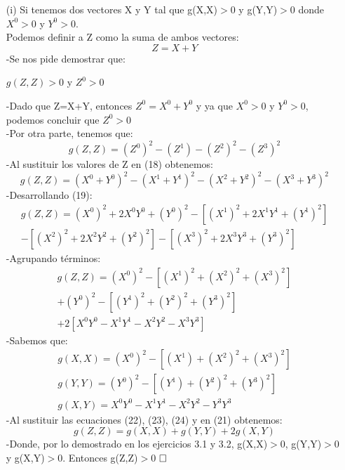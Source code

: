 \documentclass[a4paper, 11pt]{article}
\begin{document}
\begin{enumerate}
    \item[(i)]
    Si tenemos dos vectores X y Y tal que g(X,X)$>$0 y g(Y,Y)$>$0
    donde $X^{0}>$0 y $Y^{0}>$0.\\
    Podemos definir a Z como la suma de ambos vectores:
    \begin{equation*}
        Z=X+Y
    \end{equation*}
    -Se nos pide demostrar que:
    \begin{center}
        $g(Z,Z)>$0 y $Z^{0}>$0
    \end{center} 
    
    -Dado que Z=X+Y, entonces $Z^{0}=X^{0}+Y^{0}$ y ya que $X^{0}>$0 y $Y^{0}>$0, podemos concluir que $Z^{0}>0$\\
    -Por otra parte, tenemos que:
    \begin{equation}
        g(Z,Z)=(Z^{0})^2 - (Z^{1}) - (Z^{2})^2 - (Z^{3})^2
    \end{equation}
    -Al sustituir los valores de Z en (18) obtenemos:
    \begin{equation}
        g(Z,Z)=(X^{0}+Y^{0})^2 - (X^{1}+Y^{1})^2 - (X^{2}+Y^{2})^2 - (X^{3}+Y^{3})^2
    \end{equation}
    -Desarrollando (19):
    \begin{eqnarray}
    \nonumber g(Z,Z)=(X^{0})^2 + 2X^{0}Y^{0} + (Y^{0})^2 - [(X^{1})^2 + 2X^{1}Y^{1} + (Y^{1})^2]\\ 
    - [(X^{2})^2 + 2X^{2}Y^{2} + (Y^{2})^2] - [(X^{3})^2 + 2X^{3}Y^{3} + (Y^{3})^2]  
    \end{eqnarray}
    -Agrupando términos:
    \begin{eqnarray}
    \nonumber g(Z,Z)=(X^{0})^2 -[(X^{1})^2+(X^{2})^2+(X^{3})^2]\\ \nonumber + (Y^{0})^2 - [(Y^{1})^2+(Y^{2})^2 +(Y^{3})^2]\\+ 2[X^{0}Y^{0}  - X^{1}Y^{1} - X^{2}Y^{2} - X^{3}Y^{3}] 
    \end{eqnarray}
    -Sabemos que:
    \begin{eqnarray}
     g(X,X)=(X^{0})^2 - [(X^{1}) + (X^{2})^2 + (X^{3})^2]\\
     g(Y,Y)=(Y^{0})^2 - [(Y^{1}) + (Y^{2})^2 + (Y^{3})^2]\\
     g(X,Y)=X^{0}Y^{0} - X^{1}Y^{1} - X^{2}Y^{2} - Y^{3}Y^{3}
    \end{eqnarray}
    -Al sustituir las ecuaciones (22), (23), (24) y en (21) obtenemos:
    \begin{equation}
        g(Z,Z)=g(X,X)+g(Y,Y) +2g(X,Y)
    \end{equation}
    -Donde, por lo demostrado en los ejercicios 3.1 y 3.2, g(X,X)$>$0, g(Y,Y)$>$0 y g(X,Y)$>$0. Entonces g(Z,Z)$>$0 
    $\hfill\square$
    

\end{enumerate}
\end{document}
